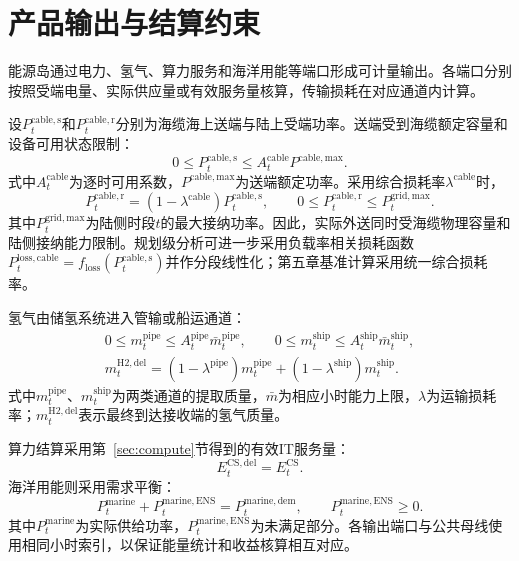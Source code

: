 \section{产品输出与结算约束}
\label{sec:product-delivery}

能源岛通过电力、氢气、算力服务和海洋用能等端口形成可计量输出。各端口分别按照受端电量、实际供应量或有效服务量核算，传输损耗在对应通道内计算。

设$P_t^{\mathrm{cable,s}}$和$P_t^{\mathrm{cable,r}}$分别为海缆海上送端与陆上受端功率。送端受到海缆额定容量和设备可用状态限制：
\begin{equation}
0\le P_t^{\mathrm{cable,s}}
\le A_t^{\mathrm{cable}}P^{\mathrm{cable,max}}.
\label{eq:cable-send}
\end{equation}
式中$A_t^{\mathrm{cable}}$为逐时可用系数，$P^{\mathrm{cable,max}}$为送端额定功率。采用综合损耗率$\lambda^{\mathrm{cable}}$时，
\begin{equation}
P_t^{\mathrm{cable,r}}
=(1-\lambda^{\mathrm{cable}})P_t^{\mathrm{cable,s}},
\qquad
0\le P_t^{\mathrm{cable,r}}\le P_t^{\mathrm{grid,max}}.
\label{eq:cable-receive}
\end{equation}
其中$P_t^{\mathrm{grid,max}}$为陆侧时段$t$的最大接纳功率。因此，实际外送同时受海缆物理容量和陆侧接纳能力限制。规划级分析可进一步采用负载率相关损耗函数$P_t^{\mathrm{loss,cable}}=f_{\mathrm{loss}}(P_t^{\mathrm{cable,s}})$并作分段线性化；第五章基准计算采用统一综合损耗率。

氢气由储氢系统进入管输或船运通道：
\begin{equation}
\begin{gathered}
0\le m_t^{\mathrm{pipe}}\le A_t^{\mathrm{pipe}}\bar m_t^{\mathrm{pipe}},\qquad
0\le m_t^{\mathrm{ship}}\le A_t^{\mathrm{ship}}\bar m_t^{\mathrm{ship}},\\
m_t^{\mathrm{H2,del}}
=(1-\lambda^{\mathrm{pipe}})m_t^{\mathrm{pipe}}
+(1-\lambda^{\mathrm{ship}})m_t^{\mathrm{ship}}.
\end{gathered}
\label{eq:h2-channel-capacity}
\end{equation}
式中$m_t^{\mathrm{pipe}}$、$m_t^{\mathrm{ship}}$为两类通道的提取质量，$\bar m$为相应小时能力上限，$\lambda$为运输损耗率；$m_t^{\mathrm{H2,del}}$表示最终到达接收端的氢气质量。

算力结算采用第~\ref{sec:compute}节得到的有效IT服务量：
\begin{equation}
E_t^{\mathrm{CS,del}}=E_t^{\mathrm{CS}}.
\label{eq:compute-delivery}
\end{equation}
海洋用能则采用需求平衡：
\begin{equation}
P_t^{\mathrm{marine}}+P_t^{\mathrm{marine,ENS}}
=P_t^{\mathrm{marine,dem}},
\qquad P_t^{\mathrm{marine,ENS}}\ge0 .
\label{eq:marine-service}
\end{equation}
其中$P_t^{\mathrm{marine}}$为实际供给功率，$P_t^{\mathrm{marine,ENS}}$为未满足部分。各输出端口与公共母线使用相同小时索引，以保证能量统计和收益核算相互对应。
